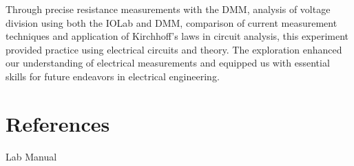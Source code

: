 \documentclass[11pt]{article}
\let\oldsection\section
\renewcommand\section{\clearpage\oldsection}
\begin{document}
    Through precise resistance measurements with the DMM, analysis of voltage division using both the IOLab and DMM, comparison of current measurement techniques and application of Kirchhoff's laws in circuit analysis, this experiment provided practice using electrical circuits and theory. The exploration enhanced our understanding of electrical measurements and equipped us with essential skills for future endeavors in electrical engineering.

    \section{References}\label{sec:references}

    Lab Manual
\end{document}
